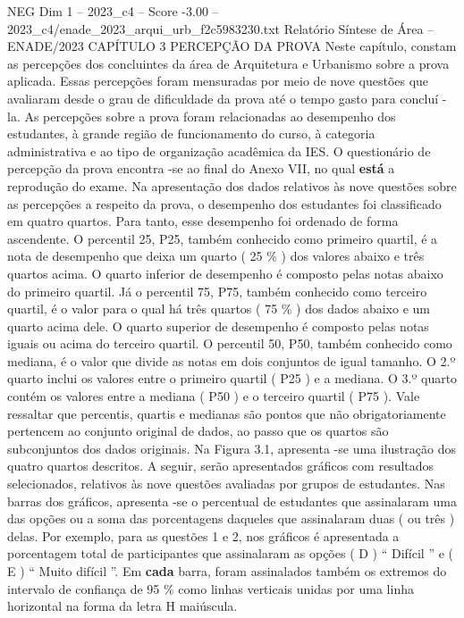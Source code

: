 \begin{textsample}{NEG Dim 1 – 2023\_c4 – Score -3.00 – 2023\_c4/enade\_2023\_arqui\_urb\_f2c5983230.txt}  \label{ex:f1_neg_244}
Relatório Síntese de Área – ENADE/2023 CAPÍTULO 3 PERCEPÇÃO DA PROVA Neste capítulo, constam as percepções dos concluintes da área de Arquitetura e Urbanismo sobre a prova aplicada.
Essas percepções foram mensuradas por meio de nove questões que avaliaram desde o grau de dificuldade da prova até o tempo gasto para concluí -la.
As percepções sobre a prova foram relacionadas ao desempenho dos estudantes, à grande região de funcionamento do curso, à categoria administrativa e ao tipo de organização acadêmica da IES.
O questionário de percepção da prova encontra -se ao final do Anexo VII, no qual \textbf{está} a reprodução do exame.
Na apresentação dos dados relativos às nove questões sobre as percepções a respeito da prova, o desempenho dos estudantes foi classificado em quatro quartos.
Para tanto, esse desempenho foi ordenado de forma ascendente.
O percentil 25, P25, também conhecido como primeiro quartil, é a nota de desempenho que deixa um quarto ( 25 \% ) dos valores abaixo e três quartos acima.
O quarto inferior de desempenho é composto pelas notas abaixo do primeiro quartil.
Já o percentil 75, P75, também conhecido como terceiro quartil, é o valor para o qual há três quartos ( 75 \% ) dos dados abaixo e um quarto acima dele.
O quarto superior de desempenho é composto pelas notas iguais ou acima do terceiro quartil.
O percentil 50, P50, também conhecido como mediana, é o valor que divide as notas em dois conjuntos de igual tamanho.
O 2.º quarto inclui os valores entre o primeiro quartil ( P25 ) e a mediana.
O 3.º quarto contém os valores entre a mediana ( P50 ) e o terceiro quartil ( P75 ).
Vale ressaltar que percentis, quartis e medianas são pontos que não obrigatoriamente pertencem ao conjunto original de dados, ao passo que os quartos são subconjuntos dos dados originais.
Na Figura 3.1, apresenta -se uma ilustração dos quatro quartos descritos.
A seguir, serão apresentados gráficos com resultados selecionados, relativos às nove questões avaliadas por grupos de estudantes.
Nas barras dos gráficos, apresenta -se o percentual de estudantes que assinalaram uma das opções ou a soma das porcentagens daqueles que assinalaram duas ( ou três ) delas.
Por exemplo, para as questões 1 e 2, nos gráficos é apresentada a porcentagem total de participantes que assinalaram as opções ( D ) “ Difícil ” e ( E ) “ Muito difícil ”.
Em \textbf{cada} barra, foram assinalados também os extremos do intervalo de confiança de 95 \% como linhas verticais unidas por uma linha horizontal na forma da letra H maiúscula.

\end{textsample}
